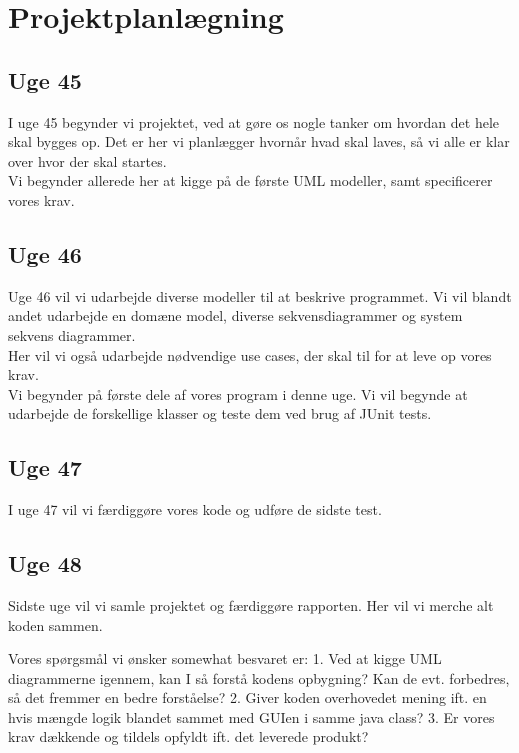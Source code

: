 \section{Projektplanlægning}
\subsection{Uge 45}
I uge 45 begynder vi projektet, ved at gøre os nogle tanker om hvordan det hele skal bygges op. Det er her vi planlægger hvornår hvad skal laves, så vi alle er klar over hvor der skal startes.\\
Vi begynder allerede her at kigge på de første UML modeller, samt specificerer vores krav.

\subsection{Uge 46}
Uge 46 vil vi udarbejde diverse modeller til at beskrive programmet. Vi vil blandt andet udarbejde en domæne model, diverse sekvensdiagrammer og system sekvens diagrammer. \\
Her vil vi også udarbejde nødvendige use cases, der skal til for at leve op vores krav.\\
Vi begynder på første dele af vores program i denne uge. Vi vil begynde at udarbejde de forskellige klasser og teste dem ved brug af JUnit tests.

\subsection{Uge 47}
I uge 47 vil vi færdiggøre vores kode og udføre de sidste test. 

\subsection{Uge 48}
Sidste uge vil vi samle projektet og færdiggøre rapporten. Her vil vi merche alt koden sammen. 


Vores spørgsmål vi ønsker somewhat besvaret er:
1. Ved at kigge UML diagrammerne igennem, kan I så forstå kodens opbygning? Kan de evt. forbedres, så det fremmer en bedre forståelse?
2. Giver koden overhovedet mening ift. en hvis mængde logik blandet sammet med GUIen i samme java class?
3. Er vores krav dækkende og tildels opfyldt ift. det leverede produkt?
